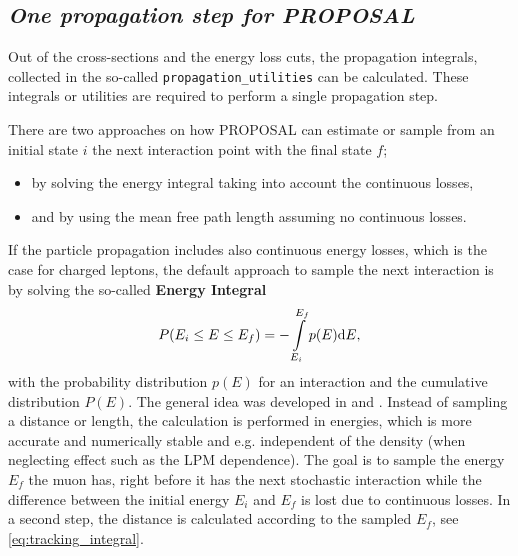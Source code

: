 %

\subsection{\textit{One propagation step for PROPOSAL}} \label{sec:prop_util}

Out of the cross-sections and the energy loss cuts, the propagation integrals, collected in the so-called \texttt{propagation\_utilities} can be calculated.
These integrals or utilities are required to perform a single propagation step.

There are two approaches on how PROPOSAL can estimate or sample from an initial state $i$ the next interaction point with the final state $f$;
\begin{itemize}
    \item by solving the energy integral taking into account the continuous losses,
    \item and by using the mean free path length assuming no continuous losses.
\end{itemize}
If the particle propagation includes also continuous energy losses, which is the case for charged leptons, the default approach to sample the next interaction is by solving the so-called \textbf{Energy Integral}
\begin{align} \label{eq:prop_cdf_general}
    P(E_i \leq E \leq E_f) = - \int\limits_{E_i}^{E_f} p(E) \mathrm{d} E ,
\end{align}
with the probability distribution $p(E)$ for an interaction and the cumulative distribution $P(E)$.
The general idea was developed in \cite{Sokalski01MUM} and \cite{Chirkin04MMC}.
Instead of sampling a distance or length, the calculation is performed in energies, which is more accurate and numerically stable and e.g. independent of the density (when neglecting effect such as the LPM dependence).
The goal is to sample the energy $E_f$ the muon has, right before it has the next stochastic interaction while the difference between the initial energy $E_i$ and $E_f$ is lost due to continuous losses.
In a second step, the distance is calculated according to the sampled $E_f$, see \eqref{eq:tracking_integral}.

